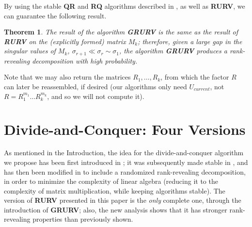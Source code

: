\documentclass{article}
\newtheorem{theorem}{Theorem}[section]
\theoremstyle{definition}
\begin{document}
By using the stable \textbf{QR} and \textbf{RQ} algorithms described in \cite{DDH07}, as well as \textbf{RURV}, we can guarantee the following result.

\begin{theorem} \label{thm_grurv} The result of the algorithm \textbf{GRURV} is the same as the result of 
\textbf{RURV} on the (explicitly formed) matrix $M_k$; therefore, given a large gap in the 
singular values of $M_k$, $\sigma_{r+1} \ll \sigma_r \sim \sigma_1$, 
the algorithm \textbf{GRURV} produces a rank-revealing decomposition with high probability.
\end{theorem}

Note that we may also return the matrices $R_1, \ldots, R_k$, from which the factor $R$ can later 
be reassembled, if desired (our algorithms only need $U_{current}$, not $R =R_1^{m_1} \ldots R_k^{m_k}$,
and so we will not compute it).



\section{Divide-and-Conquer:  Four Versions} \label{Algs} 

As mentioned in the Introduction, the idea for the divide-and-conquer algorithm we propose has been first introduced in \cite{malyshev89}; it was subsequently made stable in \cite{baidemmelgu94}, and has then been modified in \cite{DDH07} to include a randomized rank-revealing decomposition, in order to minimize the complexity of linear algebra (reducing it to the complexity of matrix multiplication, while keeping algorithms stable). 
The version of \textbf{RURV} presented in this paper is the \emph{only} complete one, 
through the introduction of \textbf{GRURV}; 
also, the new analysis shows that it has stronger rank-revealing properties than previously shown. 
\end{document}
